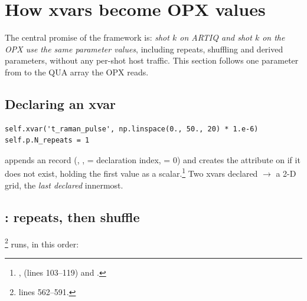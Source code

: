 \section{How xvars become OPX values}
\label{sec:xvars}

The central promise of the framework is: \emph{shot $k$ on ARTIQ and shot $k$
on the OPX use the same parameter values}, including repeats, shuffling and
derived parameters, without any per-shot host traffic. This section follows
one parameter from  to the QUA array the OPX reads.

\subsection{Declaring an xvar}

\begin{lstlisting}[style=py]
self.xvar('t_raman_pulse', np.linspace(0., 50., 20) * 1.e-6)
self.p.N_repeats = 1
\end{lstlisting}

 appends an  record (,
,  = declaration index,  = 0) and
creates the attribute on  if it does not exist, holding the
first value as a scalar.\footnote{,
 (lines 103--119) and .} Two xvars declared
$\to$ a 2-D grid, the \emph{last declared} innermost.

\subsection{: repeats, then shuffle}
\label{sec:xvars:shuffle}

\footnote{ lines 562--591.} runs,
in this order:

